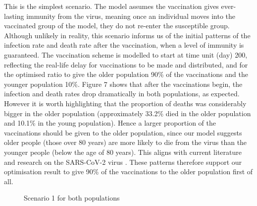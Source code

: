 \documentclass{article}
\begin{document}
\noindent
This is the simplest scenario. The model assumes the vaccination gives ever-lasting immunity from the virus, meaning once an individual moves into the vaccinated group of the model, they do not re-enter the susceptible group. Although unlikely in reality, this scenario informs us of the initial patterns of the infection rate and death rate after the vaccination, when a level of immunity is guaranteed. The vaccination scheme is modelled to start at time unit (day) 200, reflecting the real-life delay for vaccinations to be made and distributed, and for the optimised ratio to give the older population 90\% of the vaccinations and the younger population 10\%. Figure 7 shows that after the vaccinations begin, the infection and death rates drop dramatically in both populations, as expected. However it is worth highlighting that the proportion of deaths was considerably bigger in the older population (approximately 33.2\% died in the older population and 10.1\% in the young population). Hence a larger proportion of the vaccinations should be given to the older population, since our model suggests older people (those over 80 years) are more likely to die from the virus than the younger people (below the age of 80 years). This aligns with current literature and research on the SARS-CoV-2 virus \cite{mightdieyouoldie}.
\noindent
These patterns therefore support our optimisation result to give 90\% of the vaccinations to the older population first of all.

\begin{figure}[ht!]
\hspace{\fill}
\caption{Scenario 1 for both populations}
\end{figure}
\end{document}
